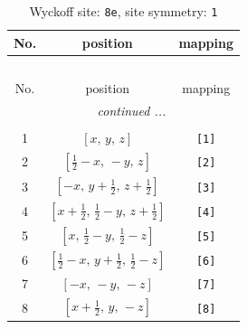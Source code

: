 \documentclass[fleqn,8pt]{jsarticle}
\begin{document}
\renewcommand{\arraystretch}{1.2}
\begin{longtable}{ccc}
\caption{Wyckoff site: {\tt 8e}, site symmetry: {\tt 1}}
 \\
 \hline \hline
No. & position & mapping \\ \hline \endfirsthead

\multicolumn{2}{l}{\tablename\ \thetable{}} \\
 \hline \hline
No. & position & mapping \\ \hline \endhead

 \hline \hline
\multicolumn{2}{r}{\footnotesize\it continued ...} \\ \endfoot

 \hline \hline
\multicolumn{2}{r}{} \\ \endlastfoot

1 & $\left[ x,\, y,\, z \right]$ & {\tt [1]} \\ \hline
2 & $\left[ \frac{1}{2} - x,\, - y,\, z \right]$ & {\tt [2]} \\ \hline
3 & $\left[ - x,\, y + \frac{1}{2},\, z + \frac{1}{2} \right]$ & {\tt [3]} \\ \hline
4 & $\left[ x + \frac{1}{2},\, \frac{1}{2} - y,\, z + \frac{1}{2} \right]$ & {\tt [4]} \\ \hline
5 & $\left[ x,\, \frac{1}{2} - y,\, \frac{1}{2} - z \right]$ & {\tt [5]} \\ \hline
6 & $\left[ \frac{1}{2} - x,\, y + \frac{1}{2},\, \frac{1}{2} - z \right]$ & {\tt [6]} \\ \hline
7 & $\left[ - x,\, - y,\, - z \right]$ & {\tt [7]} \\ \hline
8 & $\left[ x + \frac{1}{2},\, y,\, - z \right]$ & {\tt [8]} \\
\end{longtable}
\end{document}
